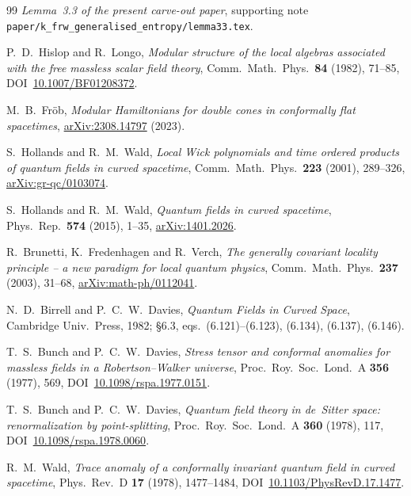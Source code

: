 \documentclass[11pt]{article}
\begin{document}
\begin{thebibliography}{99}
\emph{Lemma~3.3 of the present carve-out paper}, supporting note
\verb|paper/k_frw_generalised_entropy/lemma33.tex|.

P.~D.\ Hislop and R.\ Longo,
\emph{Modular structure of the local algebras associated with the free
massless scalar field theory},
Comm.\ Math.\ Phys.\ \textbf{84} (1982), 71--85,
DOI~\href{https://doi.org/10.1007/BF01208372}{10.1007/BF01208372}.

M.~B.\ Fr\"ob,
\emph{Modular Hamiltonians for double cones in conformally flat
spacetimes}, \href{https://arxiv.org/abs/2308.14797}{arXiv:2308.14797} (2023).

S.\ Hollands and R.~M.\ Wald,
\emph{Local Wick polynomials and time ordered products of quantum
fields in curved spacetime},
Comm.\ Math.\ Phys.\ \textbf{223} (2001), 289--326,
\href{https://arxiv.org/abs/gr-qc/0103074}{arXiv:gr-qc/0103074}.

S.\ Hollands and R.~M.\ Wald,
\emph{Quantum fields in curved spacetime}, Phys.\ Rep.\ \textbf{574}
(2015), 1--35,
\href{https://arxiv.org/abs/1401.2026}{arXiv:1401.2026}.

R.\ Brunetti, K.\ Fredenhagen and R.\ Verch,
\emph{The generally covariant locality principle -- a new paradigm for
local quantum physics},
Comm.\ Math.\ Phys.\ \textbf{237} (2003), 31--68,
\href{https://arxiv.org/abs/math-ph/0112041}{arXiv:math-ph/0112041}.

N.~D.\ Birrell and P.~C.~W.\ Davies,
\emph{Quantum Fields in Curved Space}, Cambridge Univ.\ Press, 1982;
\S 6.3, eqs.~(6.121)--(6.123), (6.134), (6.137), (6.146).

T.~S.\ Bunch and P.~C.~W.\ Davies,
\emph{Stress tensor and conformal anomalies for massless fields in a
Robertson--Walker universe},
Proc.\ Roy.\ Soc.\ Lond.\ A \textbf{356} (1977), 569,
DOI~\href{https://doi.org/10.1098/rspa.1977.0151}{10.1098/rspa.1977.0151}.

T.~S.\ Bunch and P.~C.~W.\ Davies,
\emph{Quantum field theory in de~Sitter space: renormalization by
point-splitting},
Proc.\ Roy.\ Soc.\ Lond.\ A \textbf{360} (1978), 117,
DOI~\href{https://doi.org/10.1098/rspa.1978.0060}{10.1098/rspa.1978.0060}.

R.~M.\ Wald,
\emph{Trace anomaly of a conformally invariant quantum field in curved
spacetime}, Phys.\ Rev.\ D \textbf{17} (1978), 1477--1484,
DOI~\href{https://doi.org/10.1103/PhysRevD.17.1477}{10.1103/PhysRevD.17.1477}.


\end{thebibliography}
\end{document}
